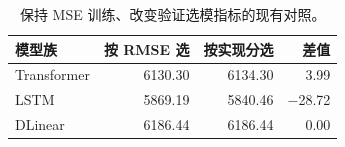\begin{table}[!htbp]
\centering\small
\caption{保持 MSE 训练、改变验证选模指标的现有对照。}\label{tab:selection}
\begin{tabularx}{\linewidth}{@{}Xrrr@{}}
\toprule
模型族 & 按 RMSE 选 & 按实现分选 & 差值 \\
\midrule
Transformer & 6130.30 & 6134.30 & 3.99 \\
LSTM & 5869.19 & 5840.46 & $-$28.72 \\
DLinear & 6186.44 & 6186.44 & 0.00 \\
\bottomrule
\end{tabularx}
\par{}
\end{table}

